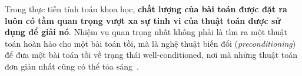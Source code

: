 \begin{note}
Trong thực tiễn tính toán khoa học, \textbf{chất lượng của bài toán được đặt ra luôn có tầm quan trọng vượt xa sự tinh vi của thuật toán được sử dụng để giải nó}. Nhiệm vụ quan trọng nhất không phải là tìm ra một thuật toán hoàn hảo cho một bài toán tồi, mà là nghệ thuật biến đổi (\textit{preconditioning}) để đưa một bài toán tồi về trạng thái well-conditioned, nơi mà những thuật toán đơn giản nhất cũng có thể tỏa sáng~\cite{trefethen1997}.
\end{note}
